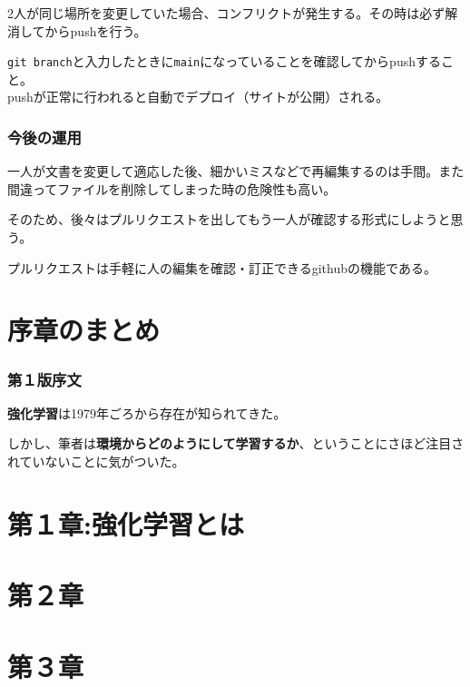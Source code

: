 \documentclass[
  letterpaper,
  DIV=11,
  numbers=noendperiod]{scrreprt}
\begin{document}
2人が同じ場所を変更していた場合、コンフリクトが発生する。その時は必ず解消してからpushを行う。

\texttt{git\ branch}と入力したときに\texttt{main}になっていることを確認してからpushすること。\\
pushが正常に行われると自動でデプロイ（サイトが公開）される。

\hypertarget{ux4ecaux5f8cux306eux904bux7528}{%
\subsection{今後の運用}\label{ux4ecaux5f8cux306eux904bux7528}}

一人が文書を変更して適応した後、細かいミスなどで再編集するのは手間。また間違ってファイルを削除してしまった時の危険性も高い。

そのため、後々はプルリクエストを出してもう一人が確認する形式にしようと思う。

プルリクエストは手軽に人の編集を確認・訂正できるgithubの機能である。


\hypertarget{ux5e8fux7ae0ux306eux307eux3068ux3081}{%
\chapter{序章のまとめ}\label{ux5e8fux7ae0ux306eux307eux3068ux3081}}

\hypertarget{ux7b2cuxff11ux7248ux5e8fux6587}{%
\subsection{第１版序文}\label{ux7b2cuxff11ux7248ux5e8fux6587}}

\textbf{強化学習}は1979年ごろから存在が知られてきた。

しかし、筆者は\textbf{環境からどのようにして学習するか}、ということにさほど注目されていないことに気がついた。


\hypertarget{ux7b2cuxff11ux7ae0ux5f37ux5316ux5b66ux7fd2ux3068ux306f}{%
\chapter{第１章:強化学習とは}\label{ux7b2cuxff11ux7ae0ux5f37ux5316ux5b66ux7fd2ux3068ux306f}}


\hypertarget{ux7b2cuxff12ux7ae0}{%
\chapter{第２章}\label{ux7b2cuxff12ux7ae0}}


\hypertarget{ux7b2cuxff13ux7ae0}{%
\chapter{第３章}\label{ux7b2cuxff13ux7ae0}}
\end{document}
